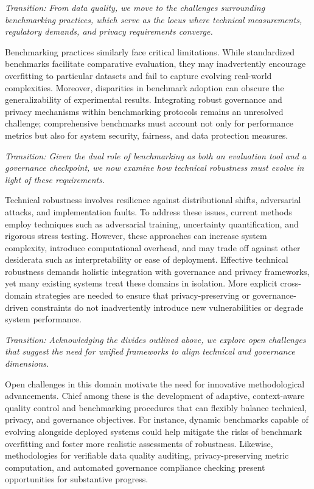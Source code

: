 \documentclass[sigconf]{acmart}
\begin{document}
\textit{Transition: From data quality, we move to the challenges surrounding benchmarking practices, which serve as the locus where technical measurements, regulatory demands, and privacy requirements converge.}

Benchmarking practices similarly face critical limitations. While standardized benchmarks facilitate comparative evaluation, they may inadvertently encourage overfitting to particular datasets and fail to capture evolving real-world complexities. Moreover, disparities in benchmark adoption can obscure the generalizability of experimental results. Integrating robust governance and privacy mechanisms within benchmarking protocols remains an unresolved challenge; comprehensive benchmarks must account not only for performance metrics but also for system security, fairness, and data protection measures.

\textit{Transition: Given the dual role of benchmarking as both an evaluation tool and a governance checkpoint, we now examine how technical robustness must evolve in light of these requirements.}

Technical robustness involves resilience against distributional shifts, adversarial attacks, and implementation faults. To address these issues, current methods employ techniques such as adversarial training, uncertainty quantification, and rigorous stress testing. However, these approaches can increase system complexity, introduce computational overhead, and may trade off against other desiderata such as interpretability or ease of deployment. Effective technical robustness demands holistic integration with governance and privacy frameworks, yet many existing systems treat these domains in isolation. More explicit cross-domain strategies are needed to ensure that privacy-preserving or governance-driven constraints do not inadvertently introduce new vulnerabilities or degrade system performance.

\textit{Transition: Acknowledging the divides outlined above, we explore open challenges that suggest the need for unified frameworks to align technical and governance dimensions.}

Open challenges in this domain motivate the need for innovative methodological advancements. Chief among these is the development of adaptive, context-aware quality control and benchmarking procedures that can flexibly balance technical, privacy, and governance objectives. For instance, dynamic benchmarks capable of evolving alongside deployed systems could help mitigate the risks of benchmark overfitting and foster more realistic assessments of robustness. Likewise, methodologies for verifiable data quality auditing, privacy-preserving metric computation, and automated governance compliance checking present opportunities for substantive progress.
\end{document}
